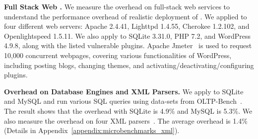 \noindent
{\bf {} Full Stack Web .}
We measure the overhead on  full-stack web services to understand the performance overhead of realistic deployment of \sysname.
We applied \sysname to four different web servers: Apache 2.4.41, Lighttpd 1.4.55, Cherokee 1.2.102, and Openlightspeed 1.5.11. 
We also apply \sysname to SQLite 3.31.0, PHP 7.2, and WordPress 4.9.8, along with the listed vulnerable plugins. %
%
Apache Jmeter~\cite{apachejmeter} is used to request 10,000 concurrent webpages, covering various functionalities of WordPress, including posting blogs, changing themes, and activating/deactivating/configuring plugins. 
%

% 

\noindent
{\bf Overhead on Database Engines and XML Parsers.} 
We apply \sysname to SQLite and MySQL and run various SQL queries using data-sets from OLTP-Bench~\cite{difallah2013oltp}. %
The result shows that the overhead with SQLite is 4.9\% and MySQL is 5.3\%. 
We also measure the overhead on four XML parsers~\cite{libxml, simplexml, libxmljs,luaexpat}. %
The average overhead is 1.4\% (Details in Appendix~\ref{appendix:microbenchmarks_xml}).




